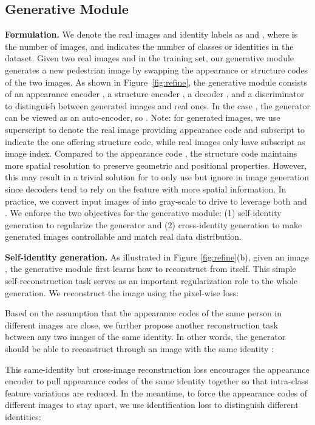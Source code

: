 \documentclass[10pt,twocolumn,letterpaper]{article}
\begin{document}
\subsection{Generative Module}
\label{sec:image generator}

\textbf{Formulation.}  
We denote the real images and identity labels as  and , where  is the number of images,  and  indicates the number of classes or identities in the dataset. Given two real images  and  in the training set, our generative module generates a new pedestrian image by swapping the appearance or structure codes of the two images. As shown in Figure~\ref{fig:refine}, the generative module consists of an appearance encoder , a structure encoder , a decoder , and a discriminator  to distinguish between generated images and real ones. In the case , the generator can be viewed as an auto-encoder, so . Note: for generated images, we use superscript to denote the real image providing appearance code and subscript to indicate the one offering structure code, while real images only have subscript as image index. Compared to the appearance code , the structure code  maintains more spatial resolution to preserve geometric and positional properties. However, this may result in a trivial solution for  to only use  but ignore  in image generation since decoders tend to rely on the feature with more spatial information. In practice, we convert input images of  into gray-scale to drive  to leverage both  and . We enforce the two objectives for the generative module: (1) self-identity generation to regularize the generator and (2) cross-identity generation to make generated images controllable and match real data distribution.   

\textbf{Self-identity generation.} 
As illustrated in Figure \ref{fig:refine}(b), given an image , the generative module first learns how to reconstruct  from itself. This simple self-reconstruction task serves as an important regularization role to the whole generation. We reconstruct the image using the pixel-wise  loss: 

Based on the assumption that the appearance codes of the same person in different images are close, we further propose another reconstruction task between any two images of the same identity. In other words, the generator should be able to reconstruct  through an image  with the same identity : 

This same-identity but cross-image reconstruction loss encourages the appearance encoder to pull appearance codes of the same identity together so that intra-class feature variations are reduced. In the meantime, to force the appearance codes of different images to stay apart, we use identification loss to distinguish different identities:
\end{document}

